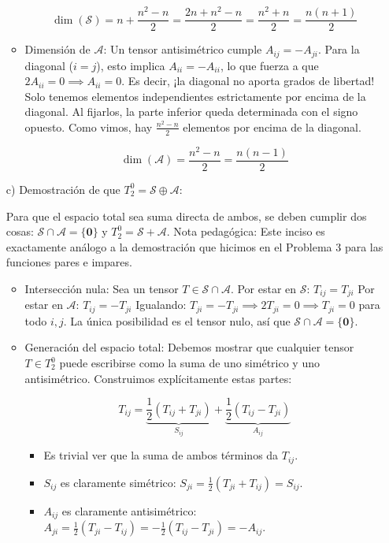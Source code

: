 \documentclass[11pt,spanish]{article}
\begin{document}
\begin{itemize}
\begin{itemize}
$$\dim(\mathcal{S}) = n + \frac{n^2-n}{2} = \frac{2n + n^2 - n}{2} = \frac{n^2+n}{2} = \frac{n(n+1)}{2}$$

\item Dimensión de $\mathcal{A}$:
Un tensor antisimétrico cumple $A_{ij} = -A_{ji}$. Para la diagonal ($i=j$), esto implica $A_{ii} = -A_{ii}$, lo que fuerza a que $2A_{ii} = 0 \implies A_{ii} = 0$. Es decir, ¡la diagonal no aporta grados de libertad!
Solo tenemos elementos independientes estrictamente por encima de la diagonal. Al fijarlos, la parte inferior queda determinada con el signo opuesto.
Como vimos, hay $\frac{n^2-n}{2}$ elementos por encima de la diagonal.

$$\dim(\mathcal{A}) = \frac{n^2-n}{2} = \frac{n(n-1)}{2}$$
\end{itemize}


\item[c)] Demostración de que $T_2^0 = \mathcal{S} \oplus \mathcal{A}$:

Para que el espacio total sea suma directa de ambos, se deben cumplir dos cosas: $\mathcal{S} \cap \mathcal{A} = \{\mathbf{0}\}$ y $T_2^0 = \mathcal{S} + \mathcal{A}$.
Nota pedagógica: Este inciso es exactamente análogo a la demostración que hicimos en el Problema 3 para las funciones pares e impares.

\begin{itemize}
\item Intersección nula: Sea un tensor $T \in \mathcal{S} \cap \mathcal{A}$.
Por estar en $\mathcal{S}$: $T_{ij} = T_{ji}$
Por estar en $\mathcal{A}$: $T_{ij} = -T_{ji}$
Igualando: $T_{ji} = -T_{ji} \implies 2T_{ji} = 0 \implies T_{ji} = 0$ para todo $i,j$. La única posibilidad es el tensor nulo, así que $\mathcal{S} \cap \mathcal{A} = \{\mathbf{0}\}$.
\item Generación del espacio total: Debemos mostrar que cualquier tensor $T \in T_2^0$ puede escribirse como la suma de uno simétrico y uno antisimétrico.
Construimos explícitamente estas partes:

$$
T_{ij} 
= 
\underbrace{\frac{1}{2}(T_{ij} + T_{ji})}_{S_{ij}} 
+ 
\underbrace{\frac{1}{2}(T_{ij} - T_{ji})}_{A_{ij}}
$$

\begin{itemize}
\item Es trivial ver que la suma de ambos términos da $T_{ij}$.
\item $S_{ij}$ es claramente simétrico: $S_{ji} = \frac{1}{2}(T_{ji} + T_{ij}) = S_{ij}$.
\item $A_{ij}$ es claramente antisimétrico: $A_{ji} = \frac{1}{2}(T_{ji} - T_{ij}) = -\frac{1}{2}(T_{ij} - T_{ji}) = -A_{ij}$.
\end{itemize}


\end{itemize}
\end{itemize}
\end{document}
